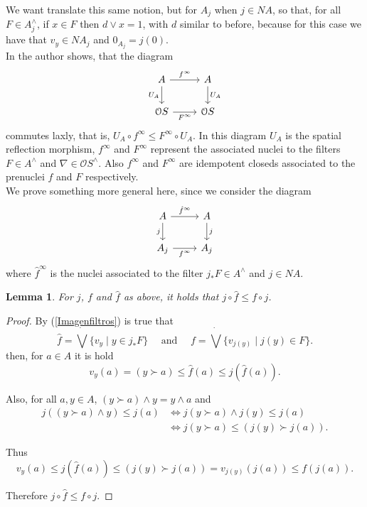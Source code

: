 \documentclass[11pt]{amsart}
\theoremstyle{plain}
\newtheorem{lem}[thm]{Lemma}
\theoremstyle{definition}
\begin{document}
We want translate this same notion, but for $A_j$ when $j\in NA$, so that, for all 
$F\in A_j^\wedge$, if $x\in F$ then $d\vee x=1$, with $d$ similar to before, because for this case we have that $v_y\in NA_j$ and $0_{A_j}=j(0)$.\\

In \cite[Lemma 8.9 and Corollary 8.10]{simmons2004vietoris} the author shows, that the diagram
\[\begin{tikzcd}
	A & A \\
	{\mathcal{O}S} & {\mathcal{O}S}
	\arrow["{f^\infty}", from=1-1, to=1-2]
	\arrow["{U_A}"', from=1-1, to=2-1]
	\arrow["{U_A}", from=1-2, to=2-2]
	\arrow["{F^\infty}"', from=2-1, to=2-2]
\end{tikzcd}\]
commutes laxly, that is, $U_A\circ f^\infty\leq F^\infty \circ U_A$. In this diagram $U_A$ is the spatial reflection morphism, $f^\infty$ and $F^\infty$ represent the associated nuclei to the filters $F\in A^\wedge$ and $\nabla\in \mathcal{O}S^\wedge$. Also $f^\infty$ and $F^\infty$ are idempotent closeds associated to the prenuclei $f$ and $F$ respectively.\\

We prove something more general here, since we consider the diagram
\[\begin{tikzcd}
	A & A \\
	{A_j} & {A_j}
	\arrow["{\hat{f}^\infty}", from=1-1, to=1-2]
	\arrow["j"', from=1-1, to=2-1]
	\arrow["j", from=1-2, to=2-2]
	\arrow["{f^\infty}"', from=2-1, to=2-2]
\end{tikzcd}\]
where $\hat{f}^\infty$ is the nuclei associated to the filter $j_*F\in A^\wedge$ and $j\in NA$.  

\begin{lem}\label{f1f}
    For $j$, $f$ and $\hat{f}$ as above, it holds that $j\circ \hat{f}\leq f\circ j$.
\end{lem}
\begin{proof}
    By (\ref{Imagenfiltros}) is true that
    \[
    \hat{f}=\dot{\bigvee}\{v_y\mid y\in j_*F\}\quad  \mbox{ and } \quad f=\dot{\bigvee}\{v_{j(y)}\mid j(y)\in F\}. 
    \]
then, for $a\in A$ it is hold
\[
v_y(a)=(y\succ a)\leq \hat{f}(a)\leq j(\hat{f}(a)).
\]

Also, for all $a, y\in A$, $(y\succ a)\wedge y=y\wedge a$ and
\[
\begin{split}
j((y\succ a)\wedge y)\leq j(a) & \Leftrightarrow j(y\succ a)\wedge j(y)\leq j(a)\\
& \Leftrightarrow j(y\succ a)\leq (j(y)\succ j(a)).
\end{split}
\]

Thus 
\[
v_y(a)\leq j(\hat{f}(a))\leq (j(y)\succ j(a))=v_{j(y)}(j(a))\leq f(j(a)).
\]

Therefore $j\circ \hat{f}\leq f\circ j$.
\end{proof}
\end{document}
